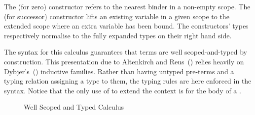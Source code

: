 The  (for zero) constructor refers to the nearest binder in a non-empty scope.
The  (for successor) constructor lifts an existing variable in a given scope
to the extended scope where an extra variable has been bound. The constructors' types
respectively normalise to the fully expanded types on their right hand side.

The syntax for this calculus guarantees that terms are well scoped-and-typed
by construction. This presentation due to
Altenkirch and Reus~(\citeyear{altenkirch1999monadic}) relies heavily on
Dybjer's~(\citeyear{dybjer1991inductive}) inductive families. Rather than
having untyped pre-terms and a typing relation assigning a type to
them, the typing rules are here enforced in the syntax. Notice that
the only use of  to extend the context is for the body of
a .

\begin{convention}
\end{convention}

\begin{figure}[h]
\caption{Well Scoped and Typed Calculus\label{fig:term}}
\end{figure}
